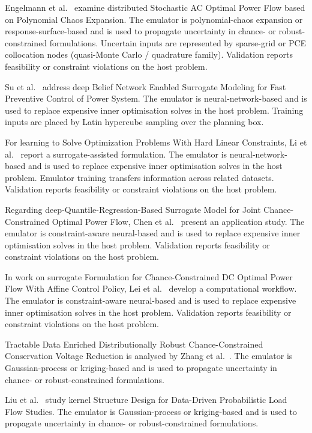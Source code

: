Engelmann et al.~\cite{Engelmann20186188} examine distributed Stochastic AC Optimal Power Flow based on Polynomial Chaos Expansion. The emulator is polynomial-chaos expansion or response-surface-based and is used to propagate uncertainty in chance- or robust-constrained formulations. Uncertain inputs are represented by sparse-grid or PCE collocation nodes (quasi-Monte Carlo / quadrature family). Validation reports feasibility or constraint violations on the host problem.

Su et al.~\cite{Su2022315} address deep Belief Network Enabled Surrogate Modeling for Fast Preventive Control of Power System. The emulator is neural-network-based and is used to replace expensive inner optimisation solves in the host problem. Training inputs are placed by Latin hypercube sampling over the planning box.

For learning to Solve Optimization Problems With Hard Linear Constraints, Li et al.~\cite{Li202359995} report a surrogate-assisted formulation. The emulator is neural-network-based and is used to replace expensive inner optimisation solves in the host problem. Emulator training transfers information across related datasets. Validation reports feasibility or constraint violations on the host problem.

Regarding deep-Quantile-Regression-Based Surrogate Model for Joint Chance-Constrained Optimal Power Flow, Chen et al.~\cite{Chen2023657} present an application study. The emulator is constraint-aware neural-based and is used to replace expensive inner optimisation solves in the host problem. Validation reports feasibility or constraint violations on the host problem.

In work on surrogate Formulation for Chance-Constrained DC Optimal Power Flow With Affine Control Policy, Lei et al.~\cite{Lei20247417} develop a computational workflow. The emulator is constraint-aware neural-based and is used to replace expensive inner optimisation solves in the host problem. Validation reports feasibility or constraint violations on the host problem.

Tractable Data Enriched Distributionally Robust Chance-Constrained Conservation Voltage Reduction is analysed by Zhang et al.~\cite{Zhang2024821}. The emulator is Gaussian-process or kriging-based and is used to propagate uncertainty in chance- or robust-constrained formulations.

Liu et al.~\cite{Liu20222679} study kernel Structure Design for Data-Driven Probabilistic Load Flow Studies. The emulator is Gaussian-process or kriging-based and is used to propagate uncertainty in chance- or robust-constrained formulations.

